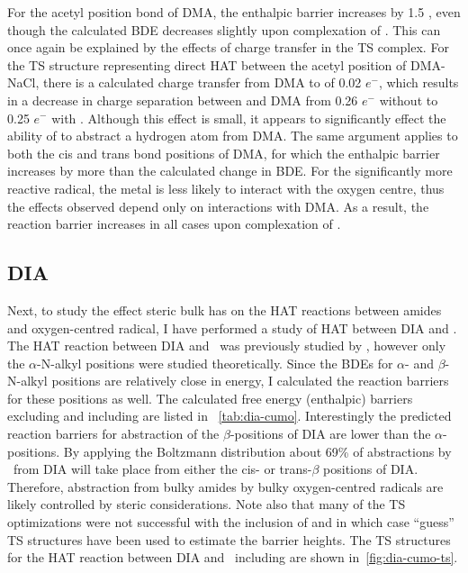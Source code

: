 For the acetyl position  bond of DMA, the enthalpic barrier increases
by 1.5 \kcalmol, even though the calculated BDE decreases slightly upon
complexation of . This can once again be explained by the effects of
charge transfer in the TS complex. For the TS structure representing direct HAT
between  the acetyl position of DMA-NaCl, there is a calculated charge
transfer from DMA to  of 0.02 $e^-$, which results in a decrease in
charge separation between  and DMA from 0.26 $e^-$ without 
to 0.25 $e^-$ with . Although this effect is small, it appears to
significantly effect the ability of  to abstract a hydrogen atom from
DMA. The same argument applies to both the cis and trans  bond
positions of DMA, for which the enthalpic barrier increases by more than the
calculated change in BDE. For the significantly more reactive 
radical, the metal is less likely to interact with the oxygen centre, thus the
effects observed depend only on interactions with DMA. As a result, the
reaction barrier increases in all cases upon complexation of .

\subsection{DIA}

Next, to study the effect steric bulk has on the HAT reactions between amides
and oxygen-centred radical, I have performed a study of HAT between DIA and
\cumo. The HAT reaction between DIA and \cumo\ was previously studied by
\citet{Salamone2014}, however only the $\alpha$-N-alkyl positions were studied
theoretically. Since the BDEs for $\alpha$- and $\beta$-N-alkyl 
positions are relatively close in energy, I calculated the reaction barriers
for these positions as well. The calculated free energy (enthalpic) barriers
excluding and including  are listed in ~\ref{tab:dia-cumo}.
Interestingly the predicted reaction barriers for abstraction of the
$\beta$-positions of DIA are lower than the $\alpha$-positions. By applying the
Boltzmann distribution about 69\% of abstractions by \cumo\ from DIA will take
place from either the cis- or trans-$\beta$ positions of DIA. Therefore,
abstraction from bulky amides by bulky oxygen-centred radicals are likely
controlled by steric considerations. Note also that many of the TS
optimizations were not successful with the inclusion of  and in which
case ``guess'' TS structures have been used to estimate the barrier heights.
The TS structures for the HAT reaction between DIA and \cumo\ including
 are shown in~\ref{fig:dia-cumo-ts}.

